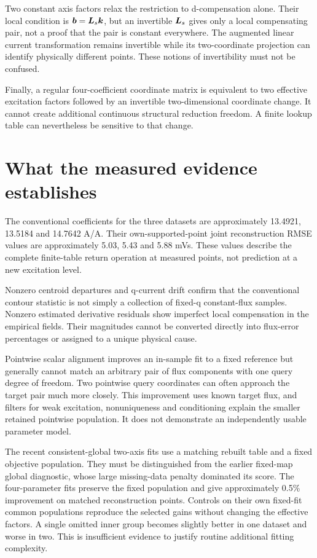 Two constant axis factors relax the restriction to d-compensation alone. Their local condition is $\bm b=\bm L_s\bm k$, but an invertible $\bm L_s$ gives only a local compensating pair, not a proof that the pair is constant everywhere. The augmented linear current transformation remains invertible while its two-coordinate projection can identify physically different points. These notions of invertibility must not be confused.

Finally, a regular four-coefficient coordinate matrix is equivalent to two effective excitation factors followed by an invertible two-dimensional coordinate change. It cannot create additional continuous structural reduction freedom. A finite lookup table can nevertheless be sensitive to that change.

\section{What the measured evidence establishes}
The conventional coefficients for the three datasets are approximately 13.4921, 13.5184 and 14.7642 A/A. Their own-supported-point joint reconstruction RMSE values are approximately 5.03, 5.43 and 5.88 mVs. These values describe the complete finite-table return operation at measured points, not prediction at a new excitation level.

Nonzero centroid departures and q-current drift confirm that the conventional contour statistic is not simply a collection of fixed-q constant-flux samples. Nonzero estimated derivative residuals show imperfect local compensation in the empirical fields. Their magnitudes cannot be converted directly into flux-error percentages or assigned to a unique physical cause.

Pointwise scalar alignment improves an in-sample fit to a fixed reference but generally cannot match an arbitrary pair of flux components with one query degree of freedom. Two pointwise query coordinates can often approach the target pair much more closely. This improvement uses known target flux, and filters for weak excitation, nonuniqueness and conditioning explain the smaller retained pointwise population. It does not demonstrate an independently usable parameter model.

The recent consistent-global two-axis fits use a matching rebuilt table and a fixed objective population. They must be distinguished from the earlier fixed-map global diagnostic, whose large missing-data penalty dominated its score. The four-parameter fits preserve the fixed population and give approximately 0.5\% improvement on matched reconstruction points. Controls on their own fixed-fit common populations reproduce the selected gains without changing the effective factors. A single omitted inner group becomes slightly better in one dataset and worse in two. This is insufficient evidence to justify routine additional fitting complexity.

